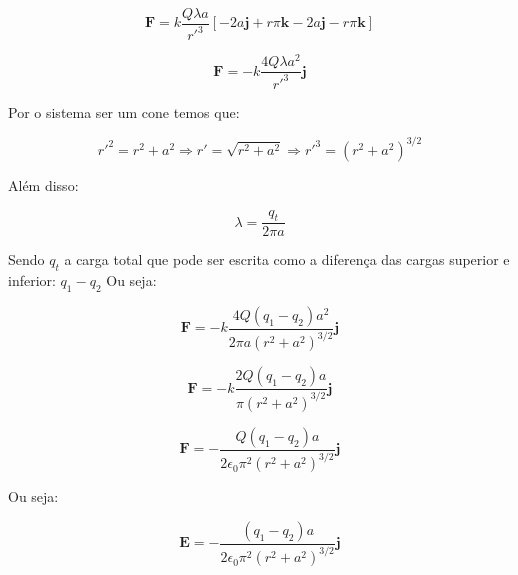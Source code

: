 \documentclass[a4paper, 12pt]{article}
\begin{document}
	\[
	\textbf{F}=k\frac{Q\lambda a}{r'^3}\left[-2a\textbf{j}+r\pi\textbf{k}-2a\textbf{j}-r\pi\textbf{k}\right]
	\]
	
	\[
	\textbf{F}=-k\frac{4Q\lambda a^2}{r'^3}\textbf{j}
	\]
	
	
	Por o sistema ser um cone temos que:
	
	\[
	r'^2=r^2+a^2\Rightarrow r'=\sqrt{r^2+a^2}\Rightarrow r'^3=(r^2+a^2)^{3/2}
	\]
	
	Além disso:
	
	\[
	\lambda=\frac{q_t}{2\pi a}
	\]
	
	Sendo $q_t$ a carga total que pode ser escrita como a diferença das cargas superior e inferior: $q_1-q_2$
	Ou seja:
	
	\[
	\textbf{F}=-k\frac{4Q(q_1-q_2) a^2}{2\pi a(r^2+a^2)^{3/2}}\textbf{j}
	\]
	
	\[
	\textbf{F}=-k\frac{2Q(q_1-q_2) a}{\pi(r^2+a^2)^{3/2}}\textbf{j}
	\]
	
	\[
	\textbf{F}=-\frac{Q(q_1-q_2) a}{2\epsilon_0\pi^2(r^2+a^2)^{3/2}}\textbf{j}
	\]
	
	Ou seja:
	
	\[
	\textbf{E}=-\frac{(q_1-q_2) a}{2\epsilon_0\pi^2(r^2+a^2)^{3/2}}\textbf{j}
	\]
	
	
\end{document}
